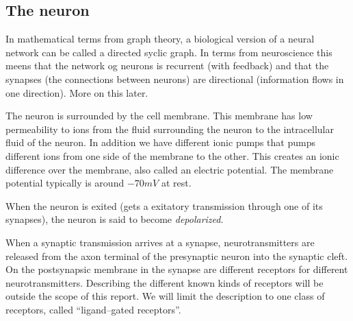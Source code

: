 
\subsection{The neuron}
\label{ssecTheNeuron}
In mathematical terms from graph theory, a biological version of a neural network can be called a directed syclic graph. 
In terms from neuroscience this meens that the network og neurons is recurrent (with feedback) and that the synapses (the connections between neurons) are directional (information flows in one direction). More on this later.


The neuron is surrounded by the cell membrane. This membrane has low permeability to ions from the fluid surrounding the neuron to the intracellular fluid of the neuron.
In addition we have different ionic pumps that pumps different ions from one side of the membrane to the other. This creates an ionic difference over the membrane, also called an electric potential.
The membrane potential typically is around $-70mV$ at rest.


When the neuron is exited (gets a exitatory transmission through one of its synapses), the neuron is said to become \emph{depolarized}. 

When a synaptic transmission arrives at a synapse, neurotransmitters are released from the axon terminal of the presynaptic neuron into the synaptic cleft.
On the postsynapsic membrane in the synapse are different receptors for different neurotransmitters\cite{PrinciplesOfNeuralScience4edKAP09}. 
Describing the different known kinds of receptors will be outside the scope of this report. We will limit the description to one class of receptors, called ``ligand--gated receptors''.

